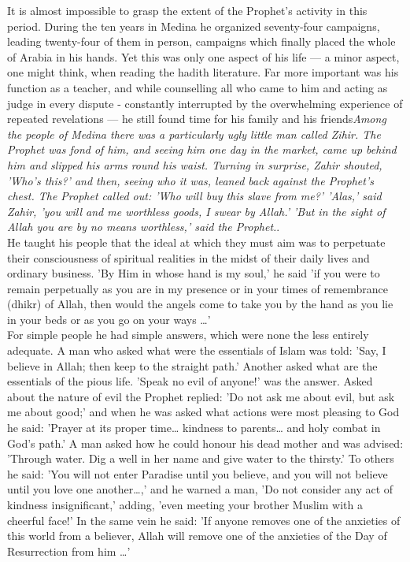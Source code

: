 \documentclass[11pt, b5paper, twoside]{book}
\begin{document}
It is almost impossible to grasp the extent of the Prophet's activity in this period. During the ten 
years in Medina he organized seventy-four campaigns, leading twenty-four of them in person, campaigns 
which finally placed the whole of Arabia in his hands. Yet this was only one aspect of his life --- a 
minor aspect, one might think, when reading the hadith literature. Far more important was his 
function as a teacher, and while counselling all who came to him and acting as judge in every dispute 
- constantly interrupted by the overwhelming experience of repeated revelations --- he still found time 
for his family and his friends\emph{Among the people of Medina there was a particularly ugly little man called Zihir. The Prophet was fond of him, and seeing him one day in the market, came up behind him and slipped his arms round his waist. Turning in surprise, Zahir shouted, 'Who's this?' and then, seeing who it was, leaned back against the Prophet's chest. The Prophet called out: 'Who will buy this slave from me?' 'Alas,' said Zahir, 'you will and me worthless goods, I swear by Allah.' 'But in the sight of Allah you are by no means worthless,' said the Prophet.}. \\

He taught his people that the ideal at which they must aim was to perpetuate their consciousness of 
spiritual realities in the midst of their daily lives and ordinary business. 'By Him in whose hand is 
my soul,' he said 'if you were to remain perpetually as you are in my presence or in your times of 
remembrance (dhikr) of Allah, then would the angels come to take you by the hand as you lie in your 
beds or as you go on your ways \ldots{}' \\

For simple people he had simple answers, which were none the less entirely adequate. A man who asked 
what were the essentials of Islam was told: 'Say, I believe in Allah; then keep to the straight 
path.' Another asked what are the essentials of the pious life. 'Speak no evil of anyone!' was the 
answer. Asked about the nature of evil the Prophet replied: 'Do not ask me about evil, but ask me 
about good;' and when he was asked what actions were most pleasing to God he said: 'Prayer at its 
proper time\ldots{} kindness to parents\ldots{} and holy combat in God's path.' A man asked how he could honour his dead mother and was advised: 'Through water. Dig a well in her name and give water to the thirsty.' To others he said: 'You will not enter Paradise until you believe, and you will not believe 
until you love one another\ldots{},' and he warned a man, 'Do not consider any act of kindness 
insignificant,' adding, 'even meeting your brother Muslim with a cheerful face!' In the same vein he 
said: 'If anyone removes one of the anxieties of this world from a believer, Allah will remove one of 
the anxieties of the Day of Resurrection from him \ldots{}' \\
\end{document}
